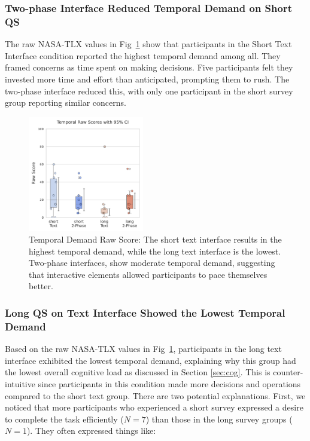 \subsubsection{Two-phase Interface Reduced Temporal Demand on Short QS} The raw NASA-TLX values in Fig~\ref{fig:temporal_cog_score} show that participants in the Short Text Interface condition reported the highest temporal demand among all. They framed concerns as time spent on making decisions. Five participants felt they invested more time and effort than anticipated, prompting them to rush. The two-phase interface reduced this, with only one participant in the short survey group reporting similar concerns.

\begin{figure} %
    \centering
    \includegraphics[width=0.45\textwidth, trim=0 13 0 13, clip]{content/image/cog/Temporal_scores.pdf}
    \captionsetup{width=0.45\textwidth, justification=justified} %
    \caption{Temporal Demand Raw Score: The short text interface results in the highest temporal demand, while the long text interface is the lowest. Two-phase interfaces, show moderate temporal demand, suggesting that interactive elements allowed participants to pace themselves better.}
    \label{fig:temporal_cog_score}
\end{figure}

\subsubsection{Long QS on Text Interface Showed the Lowest Temporal Demand} Based on the raw NASA-TLX values in Fig~\ref{fig:temporal_cog_score}, participants in the long text interface exhibited the lowest temporal demand, explaining why this group had the lowest overall cognitive load 
as discussed in Section \ref{sec:cog}. This is counter-intuitive since participants in this condition made more decisions and operations compared to the short text group. There are two potential explanations. First, we noticed that more participants who experienced a short survey expressed a desire to complete the task efficiently ($N=7$) than those in the long survey groups ($N=1$). They often expressed things like:

